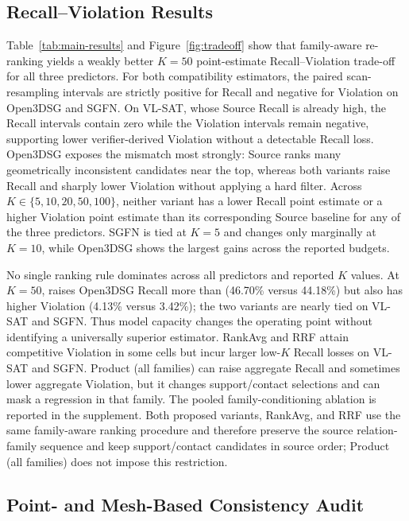 \subsection{Recall--Violation Results}

Table~\ref{tab:main-results} and Figure~\ref{fig:tradeoff} show that
family-aware re-ranking yields a weakly better $K=50$ point-estimate
Recall--Violation trade-off for all three predictors. For both compatibility
estimators, the paired scan-resampling intervals are strictly positive for
Recall and negative for Violation on Open3DSG and SGFN. On VL-SAT, whose Source
Recall is already high, the Recall intervals contain zero while the Violation
intervals remain negative, supporting lower verifier-derived Violation without
a detectable Recall loss. Open3DSG exposes the mismatch most strongly: Source
ranks many geometrically inconsistent candidates near the top, whereas both
\method{} variants raise Recall and sharply lower Violation without applying a
hard filter. Across $K\in\{5,10,20,50,100\}$, neither variant has a lower Recall
point estimate or a higher Violation point estimate than its corresponding
Source baseline for any of the three predictors. SGFN is tied at $K=5$ and
changes only marginally at $K=10$, while Open3DSG shows the largest gains across
the reported budgets.

No single ranking rule dominates across all predictors and reported $K$ values.
At $K=50$, \methodmlp{} raises Open3DSG Recall more than \methodlinear{}
(46.70\% versus 44.18\%) but also has higher Violation (4.13\% versus 3.42\%);
the two variants are nearly tied on VL-SAT and SGFN. Thus model capacity changes
the operating point without identifying a universally superior estimator.
RankAvg and RRF attain competitive Violation in some cells but incur larger
low-$K$ Recall losses on VL-SAT and SGFN. Product (all families) can raise
aggregate Recall and sometimes lower aggregate Violation, but it changes
support/contact selections and can mask a regression in that family. The pooled
family-conditioning ablation is reported in the supplement. Both proposed
variants, RankAvg, and RRF use the same family-aware ranking procedure and
therefore preserve the source relation-family sequence and keep support/contact
candidates in source order; Product (all families) does not impose this
restriction.

\subsection{Point- and Mesh-Based Consistency Audit}

